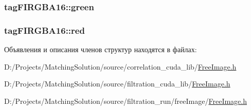 \hypertarget{structtag_f_i_r_g_b_a16_0ae72ef6b7fe786b9ea6068579cd3f2d}{
\subsubsection[{green}]{ {\bf tagFIRGBA16::green}}}
\label{structtag_f_i_r_g_b_a16_0ae72ef6b7fe786b9ea6068579cd3f2d}


\hypertarget{structtag_f_i_r_g_b_a16_580143c8b2f5e28721972342a6facd01}{
\subsubsection[{red}]{ {\bf tagFIRGBA16::red}}}
\label{structtag_f_i_r_g_b_a16_580143c8b2f5e28721972342a6facd01}




Объявления и описания членов структур находятся в файлах:\begin{CompactItemize}
\item 
D:/Projects/MatchingSolution/source/correlation\_\-cuda\_\-lib/\hyperlink{correlation__cuda__lib_2_free_image_8h}{FreeImage.h}\item 
D:/Projects/MatchingSolution/source/filtration\_\-cuda\_\-lib/\hyperlink{filtration__cuda__lib_2_free_image_8h}{FreeImage.h}\item 
D:/Projects/MatchingSolution/source/filtration\_\-run/freeImage/\hyperlink{filtration__run_2free_image_2_free_image_8h}{FreeImage.h}\end{CompactItemize}
